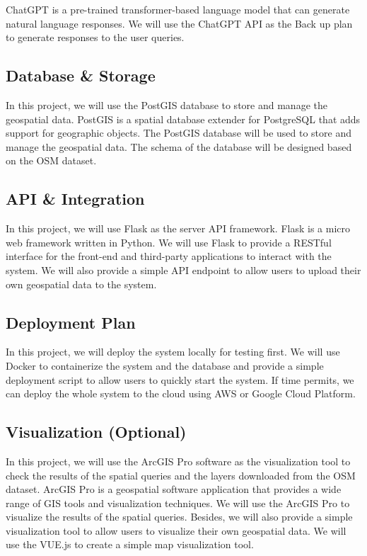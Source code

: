 \documentclass{article}
\begin{document}
ChatGPT \cite{achiam2023gpt} is a pre-trained transformer-based language model that can generate natural language responses. We will use the ChatGPT API as the Back up plan to generate responses to the user queries.

\subsection{Database \& Storage}
In this project, we will use the PostGIS database \cite{obe2021postgis} to store and manage the geospatial data. PostGIS is a spatial database extender for PostgreSQL that adds support for geographic objects. The PostGIS database will be used to store and manage the geospatial data. The schema of the database will be designed based on the OSM dataset.

\subsection{API \& Integration}

In this project, we will use Flask as the server API framework. Flask is a micro web framework written in Python. We will use Flask to provide a RESTful interface for the front-end and third-party applications to interact with the system. We will also provide a simple API endpoint to allow users to upload their own geospatial data to the system.

\subsection{Deployment Plan}

In this project, we will deploy the system locally for testing first. We will use Docker to containerize the system and the database and provide a simple deployment script to allow users to quickly start the system. If time permits, we can deploy the whole system to the cloud using AWS or Google Cloud Platform.

\subsection{Visualization (Optional)}
In this project, we will use the ArcGIS Pro software as the visualization tool to check the results of the spatial queries and the layers downloaded from the OSM dataset. ArcGIS Pro is a geospatial software application that provides a wide range of GIS tools and visualization techniques. We will use the ArcGIS Pro to visualize the results of the spatial queries. Besides, we will also provide a simple visualization tool to allow users to visualize their own geospatial data. We will use the VUE.js to create a simple map visualization tool.
\end{document}
